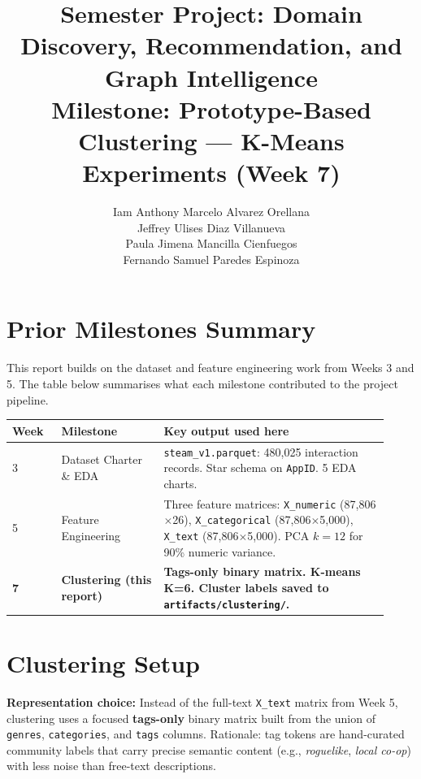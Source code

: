\documentclass[11pt,a4paper]{article}
\title{Semester Project: Domain Discovery, Recommendation, and Graph Intelligence\\
\large Milestone: Prototype-Based Clustering --- K-Means Experiments (Week 7)}
\author{Iam Anthony Marcelo Alvarez Orellana \\ Jeffrey Ulises Diaz Villanueva \\ Paula Jimena Mancilla Cienfuegos \\ Fernando Samuel Paredes Espinoza}
\date{}
\begin{document}
\maketitle
\onehalfspacing

\section{Prior Milestones Summary}

This report builds on the dataset and feature engineering work from Weeks 3 and 5. The table below summarises what each milestone contributed to the project pipeline.

\begin{longtable}{p{0.12\linewidth}p{0.25\linewidth}p{0.55\linewidth}}
\toprule
\textbf{Week} & \textbf{Milestone} & \textbf{Key output used here} \\
\midrule
3 & Dataset Charter \& EDA & \texttt{steam\_v1.parquet}: 480,025 interaction records. Star schema on \texttt{AppID}. 5 EDA charts. \\
5 & Feature Engineering & Three feature matrices: \texttt{X\_numeric} (87,806$\times$26), \texttt{X\_categorical} (87,806$\times$5,000), \texttt{X\_text} (87,806$\times$5,000). PCA $k{=}12$ for 90\% numeric variance. \\
\midrule
\textbf{7} & \textbf{Clustering (this report)} & \textbf{Tags-only binary matrix. K-means K=6. Cluster labels saved to \texttt{artifacts/clustering/}.} \\
\bottomrule
\end{longtable}

\section{Clustering Setup}

\textbf{Representation choice:} Instead of the full-text \texttt{X\_text} matrix from Week 5, clustering uses a focused \textbf{tags-only} binary matrix built from the union of \texttt{genres}, \texttt{categories}, and \texttt{tags} columns. Rationale: tag tokens are hand-curated community labels that carry precise semantic content (e.g., \textit{roguelike}, \textit{local co-op}) with less noise than free-text descriptions.
\end{document}
